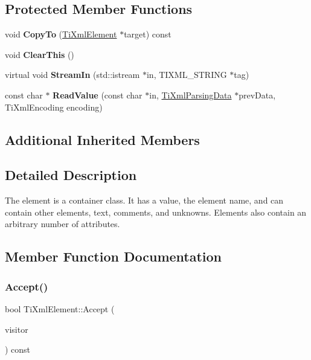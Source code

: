 \subsection*{Protected Member Functions}
\begin{DoxyCompactItemize}
\item 
\hypertarget{class_ti_xml_element_ab931f2208ed76ba03465d8a1f86b5935}{}\label{class_ti_xml_element_ab931f2208ed76ba03465d8a1f86b5935} 
void {\bfseries Copy\+To} (\hyperlink{class_ti_xml_element}{Ti\+Xml\+Element} $\ast$target) const
\item 
\hypertarget{class_ti_xml_element_a5670933ec2d7d9763b9891acc05d7f7d}{}\label{class_ti_xml_element_a5670933ec2d7d9763b9891acc05d7f7d} 
void {\bfseries Clear\+This} ()
\item 
\hypertarget{class_ti_xml_element_a6884b491fb4708dae566f3ddc1476536}{}\label{class_ti_xml_element_a6884b491fb4708dae566f3ddc1476536} 
virtual void {\bfseries Stream\+In} (std\+::istream $\ast$in, T\+I\+X\+M\+L\+\_\+\+S\+T\+R\+I\+NG $\ast$tag)
\item 
\hypertarget{class_ti_xml_element_ac786bce103042d3837c4cc2ff6967d41}{}\label{class_ti_xml_element_ac786bce103042d3837c4cc2ff6967d41} 
const char $\ast$ {\bfseries Read\+Value} (const char $\ast$in, \hyperlink{class_ti_xml_parsing_data}{Ti\+Xml\+Parsing\+Data} $\ast$prev\+Data, Ti\+Xml\+Encoding encoding)
\end{DoxyCompactItemize}
\subsection*{Additional Inherited Members}


\subsection{Detailed Description}
The element is a container class. It has a value, the element name, and can contain other elements, text, comments, and unknowns. Elements also contain an arbitrary number of attributes. 

\subsection{Member Function Documentation}
\hypertarget{class_ti_xml_element_a01d33358cce9d1817b557d314dda3779}{}\label{class_ti_xml_element_a01d33358cce9d1817b557d314dda3779} 
\subsubsection{\texorpdfstring{Accept()}{Accept()}}
{\footnotesize\ttfamily bool Ti\+Xml\+Element\+::\+Accept (\begin{DoxyParamCaption}\item[{\hyperlink{class_ti_xml_visitor}{Ti\+Xml\+Visitor} $\ast$}]{visitor }\end{DoxyParamCaption}) const\hspace{0.3cm}{\ttfamily [virtual]}}

